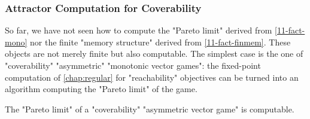 \subsubsection{Attractor Computation for Coverability}
\label{11-subsec:attr}
So far, we have not seen how to compute the "Pareto limit" derived
from \cref{11-fact-mono} nor the finite "memory structure" derived
from \cref{11-fact-finmem}.  These objects are not merely finite but
also computable.  The simplest case is the one of "coverability"
"asymmetric" "monotonic vector games": the fixed-point computation of
\cref{chap:regular} for "reachability" objectives can be turned into
an algorithm computing the "Pareto limit" of the game.

\begin{fact}\label{11-pareto-cov}
  The "Pareto limit" of a "coverability" "asymmetric vector game" is
  computable.
\end{fact}
